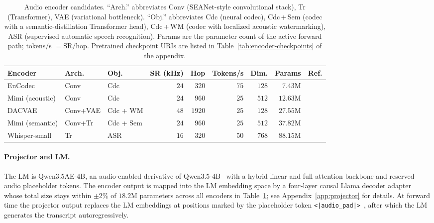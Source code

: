 \begin{table}[t]
\centering
\caption{Audio encoder candidates. ``Arch.'' abbreviates Conv (SEANet-style convolutional stack), Tr (Transformer), VAE (variational bottleneck). ``Obj.'' abbreviates Cdc (neural codec), Cdc\,+\,Sem (codec with a semantic-distillation Transformer head), Cdc\,+\,WM (codec with localized acoustic watermarking), ASR (supervised automatic speech recognition). Params are the parameter count of the active forward path; tokens/s $= \text{SR} / \text{hop}$. Pretrained checkpoint URIs are listed in Table~\ref{tab:encoder-checkpoints} of the appendix.}
\label{tab:encoders}
\small
\begin{tabular}{lllrrrrrr}
\toprule
Encoder            & Arch.     & Obj.         & SR (kHz) & Hop & Tokens/s & Dim. & Params & Ref. \\
\midrule
EnCodec            & Conv      & Cdc          & $24$ & $320$  & $75$ & $128$ & $7.43$M  & \cite{Df22} \\
Mimi (acoustic)    & Conv      & Cdc          & $24$ & $960$  & $25$ & $512$ & $12.63$M & \cite{Mi24} \\
DACVAE             & Conv+VAE  & Cdc + WM     & $48$ & $1920$ & $25$ & $128$ & $27.55$M & \cite{DAC23,AS24} \\
Mimi (semantic)    & Conv+Tr   & Cdc + Sem    & $24$ & $960$  & $25$ & $512$ & $37.82$M & \cite{Mi24} \\
Whisper-small      & Tr        & ASR          & $16$ & $320$  & $50$ & $768$ & $88.15$M & \cite{Wh23} \\
\bottomrule
\end{tabular}
\end{table}

\paragraph{Projector and LM.}
The LM is Qwen3.5AE-4B, an audio-enabled derivative of Qwen3.5-4B~\cite{QW24} with a hybrid linear and full attention backbone and reserved audio placeholder tokens.
The encoder output is mapped into the LM embedding space by a four-layer causal Llama decoder adapter~\cite{Ll23} whose total size stays within $\pm 2\%$ of $18.2$M parameters across all encoders in Table~\ref{tab:encoders}; see Appendix~\ref{app:projector} for details.
At forward time the projector output replaces the LM embeddings at positions marked by the placeholder token \texttt{<|audio\_pad|>}~\cite{QA24}, after which the LM generates the transcript autoregressively.

